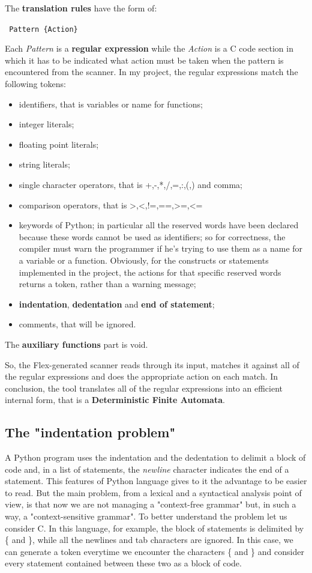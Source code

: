 \documentclass[a4paper,12pt,,titlepage,openright]{report}
\newcommand\tab[1][1cm]{\hspace*{#1}}
\begin{document}
The \textbf{translation rules} have the form of:
\begin{flushleft}
\texttt{ Pattern		\tab\{Action\} }
\end{flushleft}
Each \textit{Pattern} is a \textbf{regular expression} while the \textit{Action} is a C code section in which it has to be indicated what action must be taken when the pattern is encountered from the scanner.
In my project, the regular expressions match the following tokens:
\begin{itemize}
\item identifiers, that is variables or name for functions;
\item integer literals;
\item floating point literals;
\item string literals;
\item single character operators, that is +,-,*,/,=,:,(,) and comma;
\item comparison operators, that is >,<,!=,==,>=,<= 
\item keywords of Python; in particular all the reserved words have been declared because these words cannot be used as identifiers; so for correctness, the compiler must warn the programmer if he's trying to use them as a name for a variable or a function. Obviously, for the constructs or statements implemented in the project, the actions for that specific reserved words returns a token, rather than a warning message;
\item \textbf{indentation}, \textbf{dedentation} and \textbf{end of statement};
\item comments, that will be ignored.
\end{itemize}

The \textbf{auxiliary functions} part  is void.

So, the Flex-generated scanner reads through its input, matches it against all of the regular expressions and does the appropriate action on each match. In conclusion, the tool translates all of the regular expressions into an efficient internal form, that is a \textbf{Deterministic Finite Automata}.

\subsection{The "indentation problem"}
A Python program uses the indentation and the dedentation to delimit a block of code and, in a list of statements, the \textit{newline} character indicates the end of a statement. 
This features of Python language gives to it the advantage to be easier to read. But the main problem, from a lexical and a syntactical analysis point of view, is that now we are not managing a "context-free grammar" but, in such a way, a "context-sensitive grammar".
To better understand the problem let us consider C. In this language, for example, the block of statements is delimited by \{ and \}, while all the newlines and tab characters are ignored. In this case, we can generate a token everytime we encounter the characters \{ and \} and consider every statement contained between these two as a block of code.
\end{document}
